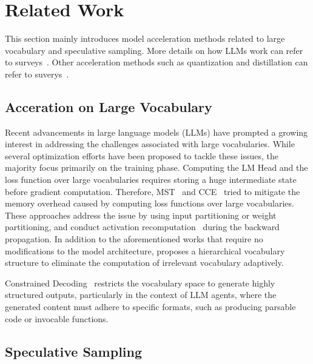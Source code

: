 \section{Related Work}
\label{sec:relate}

This section mainly introduces model acceleration methods related to large vocabulary and speculative sampling. More details on how LLMs work can refer to surveys~\citep{qiu2020pre,han2021pre,bommasani2021opportunities,zhao2023survey}. Other acceleration methods such as quantization and distillation can refer to suverys~\citep{xu2023survey,li2024large}.

\subsection{Acceration on Large Vocabulary}
Recent advancements in large language models (LLMs) have prompted a growing interest in addressing the challenges associated with large vocabularies. While several optimization efforts have been proposed to tackle these issues, the majority focus primarily on the training phase.
Computing the LM Head and the loss function over large vocabularies requires storing a huge intermediate state before gradient computation. Therefore, MST~\cite{luo2024mini} and CCE~\cite{wijmans2024cut} tried to mitigate the memory overhead caused by computing loss functions over large vocabularies. These approaches address the issue by using input partitioning or weight partitioning, and conduct activation recomputation~\cite{chen2016training} during the backward propagation.
In addition to the aforementioned works that require no modifications to the model architecture, \citet{joulin2017efficient} proposes a hierarchical vocabulary structure to eliminate the computation of irrelevant vocabulary adaptively.

Constrained Decoding~\cite{hokamp2017lexically, dong2024xgrammar} restricts the vocabulary space to generate highly structured outputs, particularly in the context of LLM agents, where the generated content must adhere to specific formats, such as producing parsable code or invocable functions.

\subsection{Speculative Sampling}

